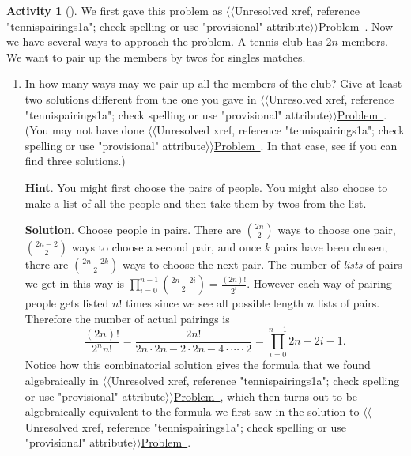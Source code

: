 \documentclass[10pt,]{book}
\theoremstyle{plain}
\theoremstyle{definition}
\theoremstyle{definition}
\theoremstyle{definition}
\newtheorem{activity}[project]{Activity}
\numberwithin{equation}{chapter}
\begin{document}
\begin{activity}[]\label{tennispairings2}
\hypertarget{p-772}{}%
We first gave this problem as {$\langle\langle$Unresolved xref, reference "tennispairings1a"; check spelling or use "provisional" attribute$\rangle\rangle$}\hyperlink{}{Problem~}. Now we have several ways to approach the problem. A tennis club has \(2n\) members. We want to pair up the members by twos for singles matches.%
\begin{enumerate}[font=\bfseries,label=(\alph*),ref=\alph*]
\item\label{task-145} \hypertarget{p-773}{}%
In how many ways may we pair up all the members of the club? Give at least two solutions different from the one you gave in   {$\langle\langle$Unresolved xref, reference "tennispairings1a"; check spelling or use "provisional" attribute$\rangle\rangle$}\hyperlink{}{Problem~}. (You may not have done {$\langle\langle$Unresolved xref, reference "tennispairings1a"; check spelling or use "provisional" attribute$\rangle\rangle$}\hyperlink{}{Problem~}. In that case, see if you can find three solutions.)%
\par\smallskip%
\noindent\textbf{Hint}.\hypertarget{hint-67}{}\quad%
\hypertarget{p-774}{}%
You might first choose the pairs of people. You might also choose to make a list of all the people and then take them by twos from the list.%
\par\smallskip%
\noindent\textbf{Solution}.\hypertarget{solution-58}{}\quad%
\hypertarget{p-775}{}%
Choose people in pairs. There are \(\binom{2n}{2}\) ways to choose one pair, \(\binom{2n-2}{2}\) ways to choose a second pair, and once \(k\) pairs have been chosen, there are \(\binom{2n-2k}{2}\) ways to choose the next pair. The number of \emph{lists} of pairs we get in this way is \(\prod_{i=0}^{n-1} \binom{2n-2i}{2}= \frac{(2n)!}{2^i}\). However each way of pairing people gets listed \(n!\) times since we see all possible length \(n\) lists of pairs. Therefore the number of actual pairings is%
\begin{equation*}
\frac{(2n)!}{2^n n!} = \frac{2n!}{2n\cdot2n-2\cdot2n-4\cdot \cdots\cdot 2} =  \prod_{i=0}^{n-1} 2n-2i-1.
\end{equation*}
Notice how this combinatorial solution gives the formula that we found algebraically in {$\langle\langle$Unresolved xref, reference "tennispairings1a"; check spelling or use "provisional" attribute$\rangle\rangle$}\hyperlink{}{Problem~}, which then turns out to be algebraically equivalent to the formula we first saw in the solution to {$\langle\langle$Unresolved xref, reference "tennispairings1a"; check spelling or use "provisional" attribute$\rangle\rangle$}\hyperlink{}{Problem~}.%

\end{enumerate}
\end{activity}
\end{document}
